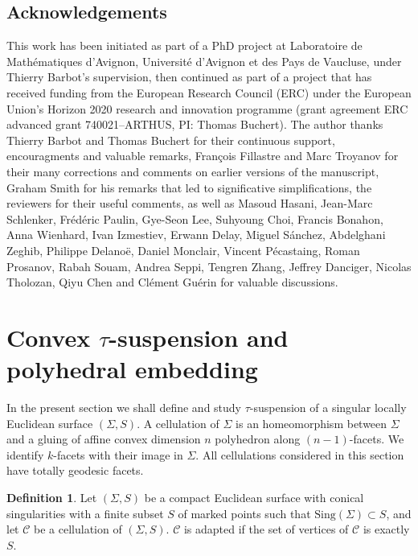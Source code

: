 \documentclass[a4paper,12pt]{article}
\def\sing{\mathrm{Sing}}
\def\Cell{\mathcal C}
\def\sing{\mathrm{Sing}}
\def\sing{\mathrm{Sing}}
\theoremstyle{definition}
\newtheorem{defi}[lem]{Definition}	%
\begin{document}
	\subsection*{Acknowledgements}
		This work has been initiated as part of a PhD project at Laboratoire de Mathématiques d'Avignon, Université d'Avignon et des Pays de Vaucluse, under Thierry Barbot's supervision, then continued as part of a project that has received funding from the European Research Council (ERC) under the European Union's Horizon 2020 research and innovation programme (grant agreement ERC advanced grant 740021--ARTHUS, PI: Thomas Buchert).  The author thanks Thierry Barbot and Thomas Buchert for their continuous support, encouragments and valuable remarks, François Fillastre and Marc Troyanov for their many corrections and comments on earlier versions of the manuscript, Graham Smith for his remarks that led to significative simplifications, the reviewers for their useful comments, as well as Masoud Hasani, Jean-Marc Schlenker, Frédéric Paulin, Gye-Seon Lee, Suhyoung Choi, Francis Bonahon, Anna Wienhard, Ivan Izmestiev, Erwann Delay, Miguel Sánchez, Abdelghani Zeghib, Philippe Delanoë, Daniel Monclair, Vincent Pécastaing, Roman Prosanov, Rabah Souam, Andrea Seppi, Tengren Zhang, Jeffrey Danciger, Nicolas Tholozan, Qiyu Chen and Clément Guérin for valuable discussions.
		
		

	
		
		
				\section{Convex $\tau$-suspension and polyhedral embedding}
				\label{sec:tau_susp}

						In the present section we shall define and study $\tau$-suspension of a singular locally Euclidean surface $(\Sigma, S)$.  A cellulation of $\Sigma$ is an homeomorphism between $\Sigma$ and a gluing of affine convex dimension $n$ polyhedron along $(n-1)$-facets. We identify $k$-facets with their image in $\Sigma$. All cellulations considered in this section have totally geodesic facets.
						
						
					\begin{defi}
					Let $(\Sigma, S)$ be a compact Euclidean surface with conical singularities with a finite subset $S$ of marked points such that $\sing(\Sigma)\subset S$,
					and let $\Cell$ be a cellulation of $(\Sigma, S)$.
				$\Cell$ is adapted if the set of vertices of $\Cell$ is exactly $S$.

					 
					 
					\end{defi}
					
\end{document}
